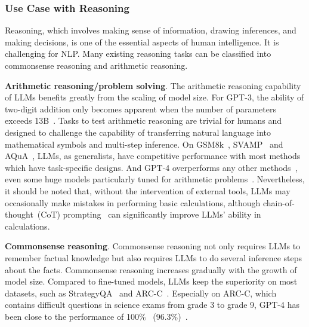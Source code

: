 \documentclass[manuscript,screen, nonacm]{acmart}
\begin{document}
\subsubsection{Use Case with Reasoning} Reasoning, which involves making sense of information, drawing inferences, and making decisions, is one of the essential aspects of human intelligence. It is challenging for NLP. Many existing reasoning tasks can be classified into commonsense reasoning and arithmetic reasoning.

\noindent\textbf{Arithmetic reasoning/problem solving}. 
The arithmetic reasoning capability of LLMs benefits greatly from the scaling of model size. For GPT-3, the ability of two-digit addition only becomes apparent when the number of parameters exceeds 13B~\cite{brown2020language}. Tasks to test arithmetic reasoning are trivial for humans 
and designed to challenge the capability of transferring natural language into mathematical symbols and multi-step inference. On GSM8k~\cite{cobbe2021training}, SVAMP~\cite{patel2021nlp} and AQuA~\cite{ling2017program}, LLMs, as generalists, have competitive performance with most methods which have task-specific designs. And GPT-4 overperforms any other methods~\cite{openai2023gpt4}, even some huge models particularly tuned for arithmetic problems~\cite{uesato2022solving}. Nevertheless, it should be noted that, without the intervention of external tools, LLMs may occasionally make mistakes in performing basic calculations, although chain-of-thought~(CoT) prompting~\cite{wei2022chain} can significantly improve LLMs' ability in calculations. 


 






\noindent\textbf{Commonsense reasoning}. Commonsense reasoning not only requires LLMs to remember factual knowledge but also requires LLMs to do several inference steps about the facts. Commonsense reasoning increases gradually with the growth of model size. Compared to fine-tuned models, LLMs keep the superiority on most datasets, such as StrategyQA~\cite{geva2021did} and ARC-C~\cite{clark2018think}. Especially on  ARC-C, which contains difficult questions in science exams from grade 3 to grade 9, GPT-4 has been close to the performance of 100\% ~(96.3\%)~\cite{openai2023gpt4}. 


 
\end{document}
